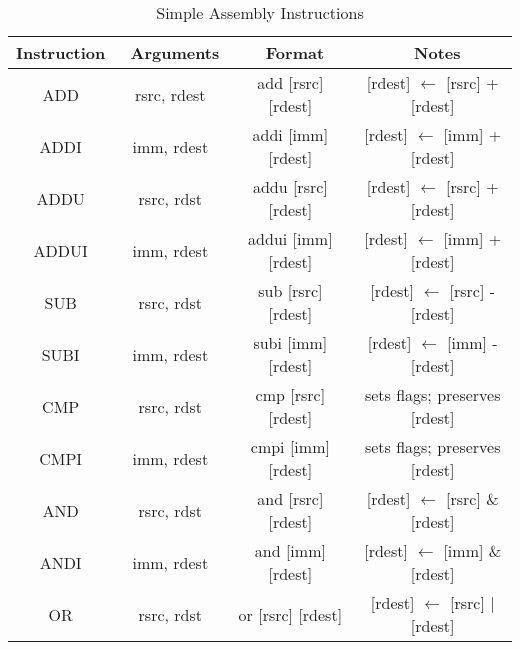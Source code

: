 \documentclass[onecolumn, 12pt]{IEEEtran}
\begin{document}
\pagebreak
\begin{table}[H]
\renewcommand{\arraystretch}{1.5}
\caption{Simple Assembly Instructions}
\centering
\begin{tabular}{c | c | c | c}
\hline
\bfseries Instruction & \ \bfseries Arguments & \ \bfseries Format & \ \bfseries Notes\\
\hline
\hline
ADD & rsrc, rdest & add [rsrc] [rdest] & [rdest] \begin{math} \leftarrow \end{math} [rsrc] + [rdest] \\
\hline
ADDI & imm, rdest & addi [imm] [rdest] & [rdest] \begin{math} \leftarrow \end{math} [imm] + [rdest]\\
\hline
ADDU & rsrc, rdst & addu [rsrc] [rdest] & [rdest] \begin{math} \leftarrow \end{math} [rsrc] + [rdest]\\
\hline
ADDUI & imm, rdest &addui [imm] [rdest] & [rdest] \begin{math} \leftarrow \end{math} [imm] + [rdest]\\
\hline
SUB & rsrc, rdst & sub [rsrc] [rdest] & [rdest] \begin{math} \leftarrow \end{math} [rsrc] - [rdest]\\
\hline
SUBI  & imm, rdest & subi [imm] [rdest] & [rdest] \begin{math} \leftarrow \end{math} [imm] - [rdest]\\
\hline
CMP & rsrc, rdst & cmp [rsrc] [rdest] & sets flags; preserves [rdest]\\
\hline
CMPI  & imm, rdest & cmpi [imm] [rdest] & sets flags; preserves [rdest] \\
\hline
AND & rsrc, rdst & and [rsrc] [rdest] & [rdest] \begin{math} \leftarrow \end{math} [rsrc] \& [rdest]\\
\hline
ANDI  & imm, rdest & and  [imm] [rdest] & [rdest] \begin{math} \leftarrow \end{math} [imm] \& [rdest]\\
\hline
OR & rsrc, rdst & or [rsrc] [rdest] & [rdest] \begin{math} \leftarrow \end{math} [rsrc] \begin{math} | \end{math} [rdest]\\

\end{tabular}
\end{table}
\end{document}
